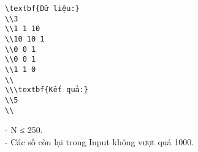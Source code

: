 \begin{verbatim}
\textbf{Dữ liệu:}
\\3
\\1 1 10
\\10 10 1
\\0 0 1
\\0 0 1
\\1 1 0
\\
\\\textbf{Kết quả:}
\\5
\\\end{verbatim}
- N ≤ 250.   
\\   - Các số còn lại trong Input không vượt quá 1000.